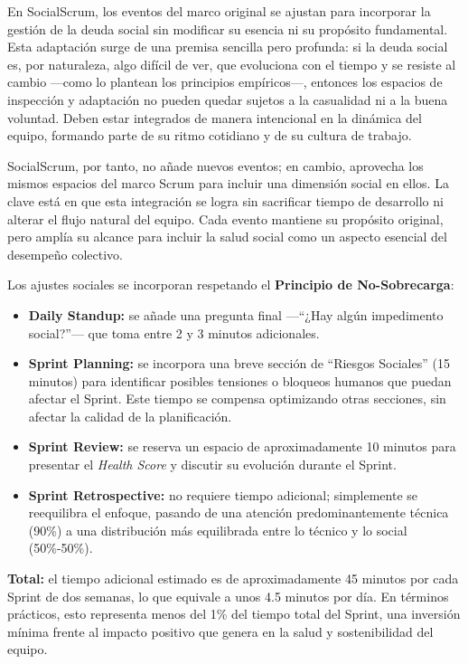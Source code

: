 En SocialScrum, los eventos del marco original se ajustan para incorporar la gestión de la deuda social sin modificar su esencia ni su propósito fundamental. Esta adaptación surge de una premisa sencilla pero profunda: si la deuda social es, por naturaleza, algo difícil de ver, que evoluciona con el tiempo y se resiste al cambio —como lo plantean los principios empíricos—, entonces los espacios de inspección y adaptación no pueden quedar sujetos a la casualidad ni a la buena voluntad. Deben estar integrados de manera intencional en la dinámica del equipo, formando parte de su ritmo cotidiano y de su cultura de trabajo.

SocialScrum, por tanto, no añade nuevos eventos; en cambio, aprovecha los mismos espacios del marco Scrum para incluir una dimensión social en ellos.
La clave está en que esta integración se logra sin sacrificar tiempo de desarrollo ni alterar el flujo natural del equipo. Cada evento mantiene su propósito original, pero amplía su alcance para incluir la salud social como un aspecto esencial del desempeño colectivo.

Los ajustes sociales se incorporan respetando el \textbf{Principio de No-Sobrecarga}:

\begin{itemize}
    \item \textbf{Daily Standup:} se añade una pregunta final —``¿Hay algún impedimento social?''— que toma entre 2 y 3 minutos adicionales.
    \item \textbf{Sprint Planning:} se incorpora una breve sección de ``Riesgos Sociales'' (15 minutos) para identificar posibles tensiones o bloqueos humanos que puedan afectar el Sprint. Este tiempo se compensa optimizando otras secciones, sin afectar la calidad de la planificación.
    \item \textbf{Sprint Review:} se reserva un espacio de aproximadamente 10 minutos para presentar el \textit{Health Score} y discutir su evolución durante el Sprint.
    \item \textbf{Sprint Retrospective:} no requiere tiempo adicional; simplemente se reequilibra el enfoque, pasando de una atención predominantemente técnica (90\%) a una distribución más equilibrada entre lo técnico y lo social (50\%-50\%).
\end{itemize}

\textbf{Total:} el tiempo adicional estimado es de aproximadamente 45 minutos por cada Sprint de dos semanas, lo que equivale a unos 4.5 minutos por día.
En términos prácticos, esto representa menos del 1\% del tiempo total del Sprint, una inversión mínima frente al impacto positivo que genera en la salud y sostenibilidad del equipo.

